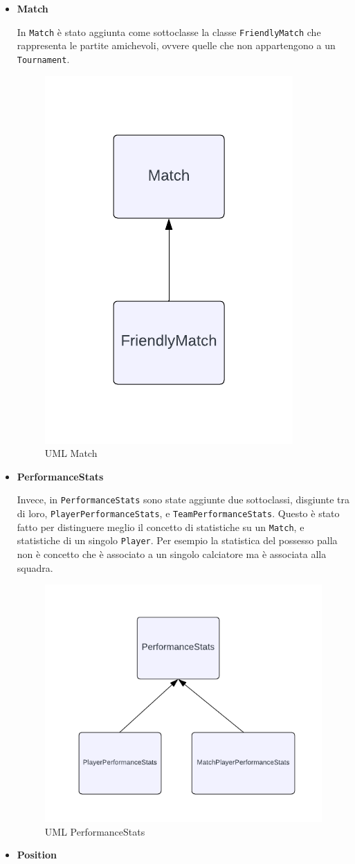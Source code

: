 \documentclass[11pt]{report} %
\begin{document}
\begin{itemize}
    \item \textbf{Match}

    In \texttt{Match} è stato aggiunta come sottoclasse la  classe \texttt{FriendlyMatch} che rappresenta le partite amichevoli, ovvere quelle che non appartengono a un \texttt{Tournament}.
    \begin{figure}[H]
        \centering
        \includegraphics[width=0.3\linewidth]{MATCH.png}
        \caption{UML Match}
    \end{figure}
    \item \textbf{PerformanceStats}

    Invece, in \texttt{PerformanceStats} sono state aggiunte due sottoclassi, disgiunte tra di loro, \texttt{PlayerPerformanceStats}, e \texttt{TeamPerformanceStats}. Questo è stato fatto per distinguere meglio il concetto di statistiche su un \texttt{Match}, e statistiche di un singolo \texttt{Player}.
    Per esempio la statistica del possesso palla non è concetto che è associato a un singolo calciatore ma è associata alla squadra.
    \begin{figure}[H]
        \centering
        \includegraphics[width=0.4\linewidth]{STATS.png}
        \caption{UML PerformanceStats}
    \end{figure}
    \item \textbf{Position}


\end{itemize}
\end{document}

